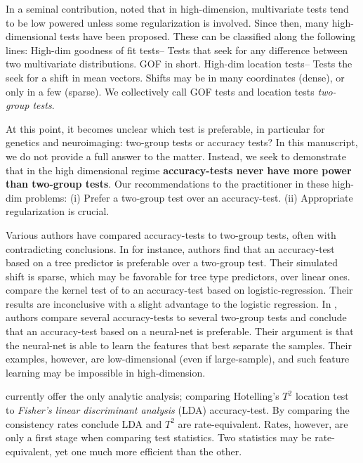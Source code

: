 \documentclass[oupdraft]{bio}
\begin{document}
In a seminal contribution, \citet{bai1996effect} noted that in high-dimension, multivariate tests tend to be low powered unless some regularization is involved. 
Since then, many high-dimensional tests have been proposed. 
These can be classified along the following lines:
High-dim goodness of fit tests-- Tests that seek for any difference between two multivariate distributions. GOF in short.
High-dim location tests-- Tests the seek for a shift in mean vectors. 
Shifts may be in many coordinates (dense), or only in a few (sparse).
We collectively call GOF tests and location tests \emph{two-group tests}. 

At this point, it becomes unclear which test is preferable, in particular for genetics and neuroimaging: two-group tests or accuracy tests?
In this manuscript, we do not provide a full answer to the matter.
Instead, we seek to demonstrate that in the high dimensional regime \textbf{accuracy-tests never have more power than two-group tests}.
Our recommendations to the practitioner in these high-dim problems:
(i) Prefer a two-group test over an accuracy-test. 
(ii) Appropriate regularization is crucial. 

Various authors have compared accuracy-tests to two-group tests, often with contradicting conclusions.
In \cite{yu2007two} for instance, authors find that an accuracy-test based on a tree predictor is preferable over a two-group test. 
Their simulated shift is sparse, which may be favorable for tree type predictors, over linear ones. 
\citet{olivetti2013kernel} compare the kernel test of \cite{gretton_kernel_2012-1} to an accuracy-test based on logistic-regression.
Their results are inconclusive with a slight advantage to the logistic regression.
In \cite{lopez2016revisiting}, authors compare several accuracy-tests to several two-group tests and conclude that an accuracy-test based on a neural-net is preferable. 
Their argument is that the neural-net is able to learn the features that best separate the samples. 
Their examples, however, are low-dimensional (even if large-sample), and such feature learning may be impossible in high-dimension.

\cite{ramdas_classification_2016} currently offer the only analytic analysis; comparing Hotelling's $T^2$ location test to \emph{Fisher's linear discriminant analysis} (LDA) accuracy-test. 
By comparing the consistency rates \cite{ramdas_classification_2016} conclude LDA and $T^2$ are rate-equivalent.
Rates, however, are only a first stage when comparing test statistics. 
Two statistics may be rate-equivalent, yet one much more efficient than the other. 
\end{document}
